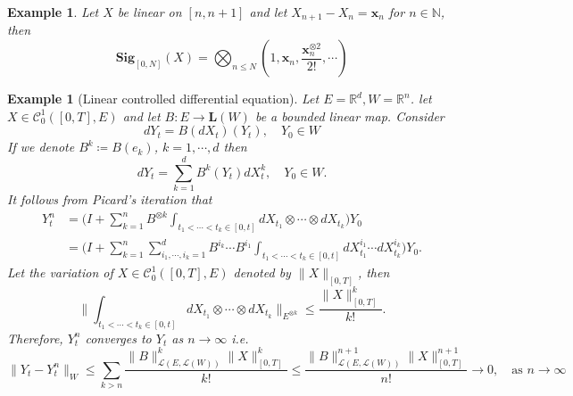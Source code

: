 \documentclass[12pt]{report}
\newtheorem{example}[theorem]{Example}
\theoremstyle{definition}
\theoremstyle{remark}
\newcommand{\R}{\mathbb{R}}
\newcommand{\N}{\mathbb{N}}
\begin{document}
\begin{example}\label{linear_chern}
  Let $X$ be linear on $[n,n+1]$ and let $X_{n+1} - X_{n} = \mathbf{x}_{n}$ for $n \in \N$, then 
  \begin{equation}
    \mathbf{Sig}_{[0,N]}(X) = \bigotimes_{n \leq N}(1, \mathbf{x}_{n},\frac{\mathbf{x}_{n}^{\otimes 2}}{2!}, \cdots) 
  \end{equation}
\end{example}


\begin{example}[Linear controlled differential equation]\label{lcde}
  Let $E = \R^{d}, W = \R^{n}$. let $X \in \mathcal{C}^{1}_{0}([0,T],E)$ and let $B\colon E \to \mathbf{L}(W)$ be a bounded linear map. Consider 
  \begin{equation}
    dY_t = B(dX_{t})(Y_{t}),\quad Y_{0} \in W  
  \end{equation}
  If we denote $B^{k} \coloneq B(e_{k})$, $k = 1,\cdots, d$ then 
  \begin{equation}\label{linear_control}
    dY_t = \sum_{k=1}^{d}B^{k}(Y_{t})dX^{k}_{t},\quad Y_{0} \in W .
  \end{equation}
  It follows from Picard's iteration that 
  \begin{equation}
    \begin{split}
      Y^{n}_{t} &= \Bigg(I + \sum_{k=1}^{n}B^{\otimes k}\int_{t_{1}<\cdots< t_{k} \in [0,t]}dX_{t_{1}}\otimes\cdots\otimes dX_{t_{k}}\Bigg) Y_{0}\\ 
      &= \Bigg(I + \sum_{k=1}^{n}\sum_{i_{1},\cdots,i_{k} = 1}^{d}B^{i_{k}}\cdots B^{i_{1}}\int_{t_{1}<\cdots< t_{k} \in [0,t]}dX_{t_{1}}^{i_{1}}\cdots dX_{t_{k}}^{i_{k}}\Bigg) Y_{0}.
    \end{split}
  \end{equation}
  Let the variation of $X \in \mathcal{C}^{1}_{0}([0,T],E)$ denoted by $\lVert X \rVert_{[0,T]}$, then 
  \begin{equation}
      \Big\lVert \int_{t_{1}<\cdots< t_{k} \in [0,t]}dX_{t_{1}}\otimes\cdots\otimes dX_{t_{k}} \Big\rVert_{E^{\otimes k}} \leq \frac{\lVert X \rVert_{[0,T]}^{k}}{k!}.
  \end{equation}
  Therefore, $Y^{n}_{t}$ converges to $Y_{t}$ as $n \to \infty$ i.e. 
  \begin{equation}
    \lVert Y_{t} - Y^{n}_{t}\rVert_{W} \leq \sum_{k > n}\frac{\lVert B\rVert_{\mathcal{L}(E,\mathcal{L}(W))}^{k}\lVert X \rVert_{[0,T]}^{k}}{k!}  \leq \frac{\lVert B\rVert_{\mathcal{L}(E,\mathcal{L}(W))}^{n+1}\lVert X \rVert_{[0,T]}^{n+1}}{n!} \to 0,\quad \text{as } n \to \infty

\end{equation}
\end{example}
\end{document}
